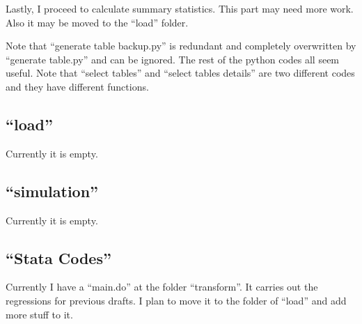 \documentclass[12pt]{article}
\begin{document}
Lastly, I proceed to calculate summary statistics. This part may need more work. Also it may be moved to the ``load'' folder.

Note that ``generate table backup.py'' is redundant and completely overwritten by ``generate table.py'' and can be ignored. The rest of the python codes all seem useful. Note that ``select tables'' and ``select tables details'' are two different codes and they have different functions. 

\subsection{``load''}
Currently it is empty. 

\subsection{``simulation''}
Currently it is empty.

\subsection{``Stata Codes''}
Currently I have a ``main.do'' at the folder ``transform''. It carries out the regressions for previous drafts. I plan to move it to the folder of ``load'' and add more stuff to it. 
\end{document}
